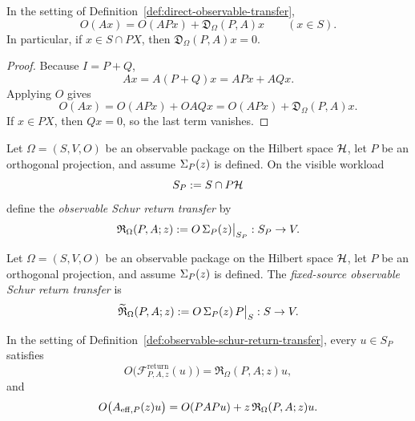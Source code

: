 \begin{proposition}
\label{prop:direct-observable-decomposition}
In the setting of Definition~\ref{def:direct-observable-transfer},
\[
O(Ax)=O(APx)+\mathfrak D_{\Omega}(P,A)x
\qquad (x\in S).
\]
In particular, if \(x\in S\cap PX\), then \(\mathfrak D_{\Omega}(P,A)x=0\).
\end{proposition}

\begin{proof}
Because \(I=P+Q\),
\[
Ax=A(P+Q)x=APx+AQx.
\]
Applying \(O\) gives
\[
O(Ax)=O(APx)+OAQx=O(APx)+\mathfrak D_{\Omega}(P,A)x.
\]
If \(x\in PX\), then \(Qx=0\), so the last term vanishes.
\end{proof}

\begin{definition}
\label{def:observable-schur-return-transfer}
Let \(\Omega=(S,V,O)\) be an observable package on the Hilbert space
\(\mathcal{H}\), let \(P\) be an orthogonal projection, and assume
\(\Sigma_{P}(z)\) is defined. On the visible workload
\[
S_P:=S\cap P\mathcal{H}
\]
define the \emph{observable Schur return transfer} by
\[
\mathfrak R_{\Omega}(P,A;z)
:=
O\,\Sigma_{P}(z)\big|_{S_P}:S_P\to V.
\]
\end{definition}

\begin{definition}
\label{def:fixed-source-observable-schur-return-transfer}
Let \(\Omega=(S,V,O)\) be an observable package on the Hilbert space
\(\mathcal{H}\), let \(P\) be an orthogonal projection, and assume
\(\Sigma_{P}(z)\) is defined. The \emph{fixed-source observable Schur return
transfer} is
\[
\widetilde{\mathfrak R}_{\Omega}(P,A;z)
:=
O\,\Sigma_{P}(z)\,P\big|_{S}:S\to V.
\]
\end{definition}

\begin{proposition}
\label{prop:observable-return-is-schur}
In the setting of Definition~\ref{def:observable-schur-return-transfer}, every
\(u\in S_P\) satisfies
\[
O\bigl(\mathcal F^{\mathrm{return}}_{P,A,z}(u)\bigr)
=
\mathfrak R_{\Omega}(P,A;z)u,
\]
and
\[
O\bigl(A_{\mathrm{eff},P}(z)u\bigr)
=
O(PAPu)+z\,\mathfrak R_{\Omega}(P,A;z)u.
\]
\end{proposition}

